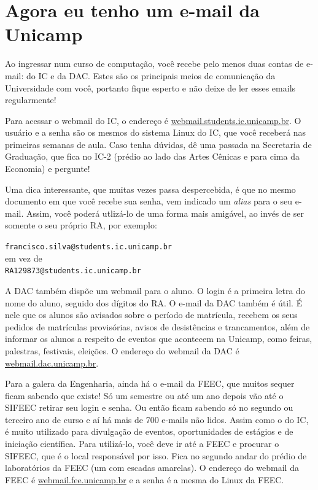 
\section{Agora eu tenho um e-mail da Unicamp}

Ao ingressar num curso de computação, você recebe pelo menos duas contas de
e-mail: do IC e da DAC. Estes são os principais meios de comunicação da
Universidade com você, portanto fique esperto e não deixe de ler esses emails
regularmente!

Para acessar o webmail do IC, o endereço é \url{webmail.students.ic.unicamp.br}.
O usuário e a senha são os mesmos do sistema Linux do IC, que você receberá nas
primeiras semanas de aula. Caso tenha dúvidas, dê uma passada na Secretaria de
Graduação, que fica no IC-2 (prédio ao lado das Artes Cênicas e para cima da
Economia) e pergunte!

Uma dica interessante, que muitas vezes passa despercebida, é que no mesmo
documento em que você recebe sua senha, vem indicado um {\it alias} para o seu
e-mail. Assim, você poderá utlizá-lo de uma forma mais amigável, ao invés de ser
somente o seu próprio RA, por exemplo:

\begin{center}
\texttt{francisco.silva@students.ic.unicamp.br}\\
em vez de\\
\texttt{RA129873@students.ic.unicamp.br}
\end{center}

A DAC também dispõe um webmail para o aluno. O login é a primeira letra do nome
do aluno, seguido dos dígitos do RA. O e-mail da DAC também é útil. É nele que
os alunos são avisados sobre o período de matrícula, recebem os seus pedidos de
matrículas provisórias, avisos de desistências e trancamentos, além de informar
os alunos a respeito de eventos que acontecem na Unicamp, como feiras,
palestras, festivais, eleições. O endereço do webmail da DAC é
\url{webmail.dac.unicamp.br}.

Para a galera da Engenharia, ainda há o e-mail da FEEC, que muitos sequer ficam
sabendo que existe! Só um semestre ou até um ano depois vão até o SIFEEC retirar
seu login e senha. Ou então ficam sabendo só no segundo ou terceiro ano de curso
e aí há mais de 700 e-mails não lidos. Assim como o do IC, é muito utilizado
para divulgação de eventos, oportunidades de estágios e de iniciação científica.
Para utilizá-lo, você deve ir até a FEEC e procurar o SIFEEC, que é o local
responsável por isso. Fica no segundo andar do prédio de laboratórios da FEEC
(um com escadas amarelas). O endereço do webmail da FEEC é
\url{webmail.fee.unicamp.br} e a senha é a mesma do Linux da FEEC.

